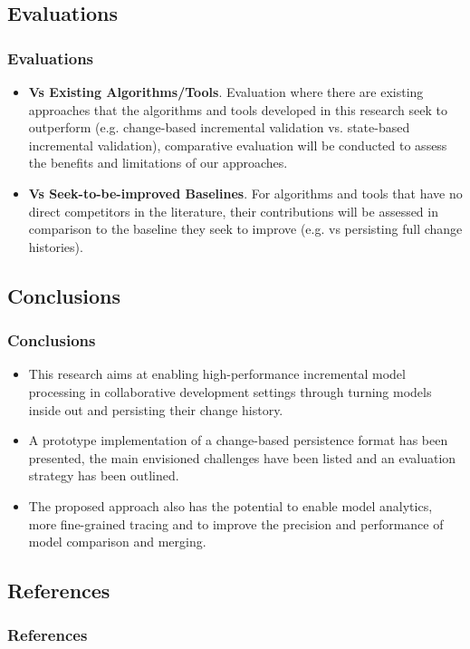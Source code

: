 \documentclass{beamer}
\begin{document}
\begin{frame}
\section{Evaluations}
\frametitle{Evaluations}
\begin{itemize}
\item \textbf{Vs Existing Algorithms/Tools}. Evaluation where there are existing approaches that the algorithms and tools developed in this research seek to outperform (e.g. change-based incremental validation vs. state-based incremental validation), comparative evaluation will be conducted to assess the benefits and limitations of our approaches. 
\item \textbf{Vs Seek-to-be-improved Baselines}. For algorithms and tools that have no direct competitors in the literature, their contributions will be assessed in comparison to the baseline they seek to improve (e.g. vs persisting full change histories).
\end{itemize}
\end{frame}

\begin{frame}
\section{Conclusions}
\frametitle{Conclusions}
\begin{itemize}
\item This research aims at enabling high-performance incremental model processing in collaborative development settings through turning models inside out and persisting their change history.
\item A prototype implementation of a change-based persistence format has been presented, the main envisioned challenges have been listed and an evaluation strategy has been outlined.
\item The proposed approach also has the potential to enable model analytics, more fine-grained tracing and to improve the precision and performance of model comparison and merging. 
\end{itemize}
\end{frame}

\begin{frame}
\section{References}
\frametitle{References}
\scriptsize


\end{frame}
\end{document}
